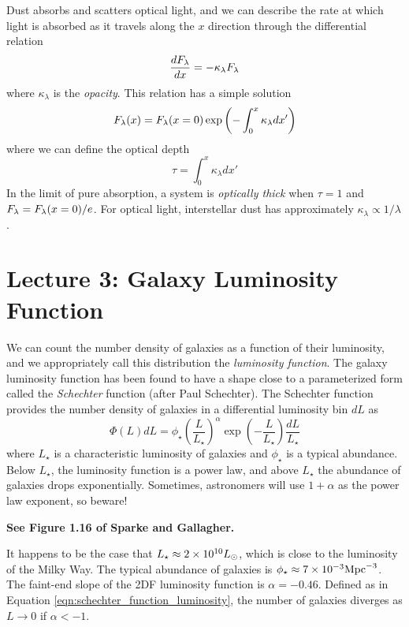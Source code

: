 \documentclass[]{article}
\begin{document}
Dust absorbs and scatters optical light, and we can describe
the rate at which light is absorbed as it travels along the
$x$ direction through the differential relation
\begin{equation}
\frac{dF_{\lambda}}{dx} = - \kappa_{\lambda} F_{\lambda}
\end{equation}
\noindent
where $\kappa_{\lambda}$ is the {\it opacity}. This relation
has a simple solution
\begin{equation}
F_{\lambda}(x) = F_{\lambda}(x=0)\exp\left(-\int_{0}^{x} \kappa_{\lambda} dx'\right)
\end{equation}
\noindent
where we can define the optical depth
\begin{equation}
\tau = \int_{0}^{x} \kappa_{\lambda} dx'
\end{equation}
\noindent
In the limit of pure absorption, a system is {\it optically thick}
when $\tau = 1$ and $F_{\lambda} = F_{\lambda}(x=0)/e$. For
optical light, interstellar dust has approximately $\kappa_{\lambda}\propto1/\lambda$.

\section{Lecture 3: Galaxy Luminosity Function}

We can count the number density of galaxies as a function of their luminosity,
and we appropriately call this distribution the {\it luminosity function}. The
galaxy luminosity function has been found to have a shape close to a parameterized
form called the {\it Schechter} function (after Paul Schechter).  The Schechter
function provides the number density of galaxies in a differential luminosity bin
$dL$ as
\begin{equation}
\label{eqn:schechter_function_luminosity}
\Phi(L)dL = \phi_{\star} \left(\frac{L}{L_{\star}}\right)^{\alpha}\exp\left(-\frac{L}{L_{\star}}\right)\frac{dL}{L_{\star}}
\end{equation}
\noindent
where $L_{\star}$ is a characteristic luminosity of galaxies and $\phi_{\star}$ is 
a typical abundance.  Below $L_\star$, the luminosity function is a power law, and
above $L_\star$ the abundance of galaxies drops exponentially. Sometimes, astronomers
will use $1+\alpha$ as the power law exponent, so beware!

{\bf See Figure 1.16 of Sparke and Gallagher.}

It happens to be the case that $L_{\star}\approx2\times10^{10}L_{\odot}$, which is close
to the luminosity of the Milky Way. The typical abundance of galaxies is $\phi_\star\approx7\times10^{-3}\mathrm{Mpc}^{-3}$. The faint-end slope of the 2DF luminosity function is $\alpha=-0.46$.
Defined as in Equation \ref{eqn:schechter_function_luminosity}, the number of galaxies
diverges as $L\to0$ if $\alpha<-1$.
\end{document}
